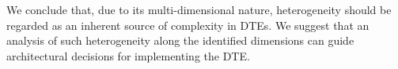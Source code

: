 We conclude that, due to its multi-dimensional nature, heterogeneity should be regarded as an inherent source of complexity in \acp{DTE}.
We suggest that an analysis of such heterogeneity along the identified dimensions can guide architectural decisions for implementing the \ac{DTE}.





